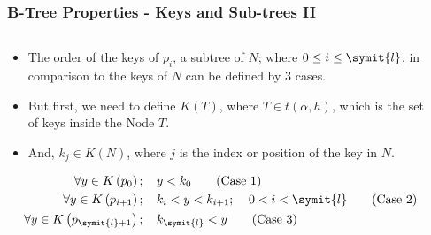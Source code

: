 \documentclass{beamer}
\begin{document}
\begin{frame}
    \frametitle{B-Tree Properties - Keys and Sub-trees II}
    \begin{columns}
        \begin{column}{\textlecolumn}
            \begin{block}{}
                \begin{itemize}
                    \item The order of the keys of \(p_i\), a subtree of \(N\); where \(0 \leq i \leq \symit{l}\), in comparison to the keys of \(N\) can be defined by 3 cases.
                    \item But first, we need to define \(K\left(T\right)\), where \(T \in t\left(\alpha, h\right)\), which is the set of keys inside the Node \(T\).
                    \item And, \(k_j \in K\left(N\right)\), where \(j\) is the index or position of the key in \(N\).
                \end{itemize}
                \vspace{0.5cm}
                \begin{align}
                    \forall y \in K\left(p_0\right);\mspace{20mu}& y < k_0 \tag{Case 1}\label{case1-subt-t-comp} \\
                    \forall y \in K\left(p_{i + 1}\right);\mspace{20mu}& k_i < y < k_{i + 1};\mspace{20mu} 0 < i < \symit{l} \tag{Case 2}\label{case2-subt-t-comp} \\
                    \forall y \in K\left(p_{\symit{l} + 1}\right);\mspace{20mu}& k_{\symit{l}} < y \tag{Case 3}\label{case3-subt-t-comp}
                \end{align}
            \end{block}
        \end{column}
        \begin{column}{\textricolumn}
            \begin{block}{}
            \end{block}
        \end{column}
    \end{columns}
\end{frame}
\end{document}
